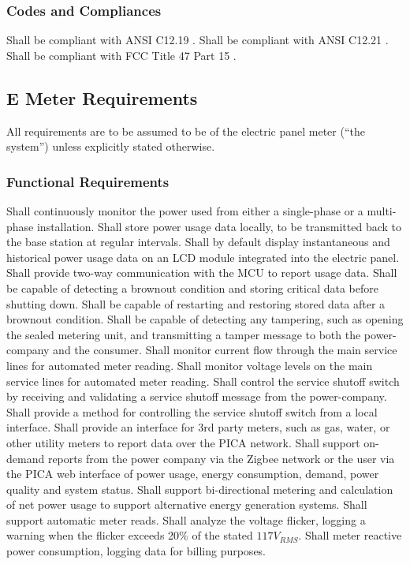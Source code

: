 \subsubsection{Codes and Compliances}
\begin{outline}[enumerate]
\1 Shall be compliant with \ac{ANSI} C12.19 \cite{ANSIC1219}.
\1 Shall be compliant with \ac{ANSI} C12.21 \cite{ANSIC1221}.
\1 Shall be compliant with \ac{FCC} Title 47 Part 15 \cite{FCC}.
\end{outline}

\subsection{E Meter Requirements}\label{sec:e_meter_reqs}
All requirements are to be assumed to be of the electric panel meter (``the system'') unless explicitly stated otherwise.

\subsubsection{Functional Requirements}
\begin{outline}[enumerate]
\1 Shall continuously monitor the power used from either a single-phase or a multi-phase installation.
\1 Shall store power usage data locally, to be transmitted back to the base station at regular intervals.
\1 Shall by default display instantaneous and historical power usage data on an \ac{LCD} module integrated into the electric panel.
\1 Shall provide two-way communication with the \ac{MCU} to report usage data.
\1 Shall be capable of detecting a brownout condition and storing critical data before shutting down.
\1 Shall be capable of restarting and restoring stored data after a brownout condition.
\1 Shall be capable of detecting any tampering, such as opening the sealed metering unit, and transmitting a tamper message to both the power-company and the consumer.
\1 Shall monitor current flow through the main service lines for automated meter reading.
\1 Shall monitor voltage levels on the main service lines for automated meter reading.
\1 Shall control the service shutoff switch by receiving and validating a service shutoff message from the power-company.
\1 Shall provide a method for controlling the service shutoff switch from a local interface.
\1 Shall provide an interface for 3rd party meters, such as gas, water, or other utility meters to report data over the PICA network.
\1 Shall support on-demand reports from the power company via the Zigbee network or the user via the PICA web interface of power usage, energy consumption, demand, power quality and system status.
\1 Shall support bi-directional metering and calculation of net power usage to support alternative energy generation systems.
\1 Shall support automatic meter reads.
\1 Shall analyze the voltage flicker, logging a warning when the flicker exceeds 20\% of the stated $117V_{RMS}$. 
\1Shall meter reactive power consumption, logging data for billing purposes.
\end{outline}

